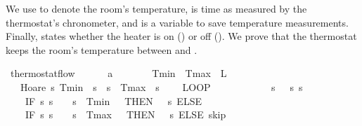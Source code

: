 \documentclass[envcountsame]{llncs}
\begin{document}
\begin{example}
We use  to denote the room's temperature, 
 is time as measured by the thermostat's chronometer, and  is a variable
to save temperature measurements. Finally,  states whether the heater is on 
() or off (). We prove that the thermostat keeps the room's 
temperature between  and .

\begin{isabellebody}
\isanewline
{}\isamarkupfalse%
\ thermostat{\isacharunderscore}flow{\isacharcolon}\ \isanewline
\ \ \ {\isachardoublequoteopen}{}\ {\isacharless}\ a{\isachardoublequoteclose}\ \ {\isachardoublequoteopen}{}\ {\isasymle}\ {\isasymtau}{\isachardoublequoteclose}\ \ {\isachardoublequoteopen}{}\ {\isacharless}\ Tmin{\isachardoublequoteclose}\ \ {\isachardoublequoteopen}Tmax\ {\isacharless}\ L{\isachardoublequoteclose}\isanewline
\ \ \ {\isachardoublequoteopen}Hoare\ {\isasymlceil}{\isasymlambda}s{\isachardot}\ Tmin\ {\isasymle}\ s{\isachardollar}{}\ {\isasymand}\ s{\isachardollar}{}\ {\isasymle}\ Tmax\ {\isasymand}\ s{\isachardollar}{}\ {\isacharequal}\ {}{\isasymrceil}\isanewline
\ \ {\isacharparenleft}LOOP\ \isanewline
\ \ \ \ %
\isanewline
\ \ \ \ {\isacharparenleft}{\isacharparenleft}{}\ {\isacharcolon}{\isacharcolon}{\isacharequal}\ {\isacharparenleft}{\isasymlambda}s{\isachardot}\ {}{\isacharparenright}{\isacharparenright}{\isacharsemicolon}{\isacharparenleft}{}\ {\isacharcolon}{\isacharcolon}{\isacharequal}\ {\isacharparenleft}{\isasymlambda}s{\isachardot}\ s{\isachardollar}{}{\isacharparenright}{\isacharparenright}{\isacharsemicolon}\isanewline
\ \ \ \ {\isacharparenleft}IF\ {\isacharparenleft}{\isasymlambda}s{\isachardot}\ s{\isachardollar}{}\ {\isacharequal}\ {}\ {\isasymand}\ s{\isachardollar}{}\ {\isasymle}\ Tmin\ {\isacharplus}\ {}{\isacharparenright}\ THEN\ {\isacharparenleft}{}\ {\isacharcolon}{\isacharcolon}{\isacharequal}\ {\isacharparenleft}{\isasymlambda}s{\isachardot}{}{\isacharparenright}{\isacharparenright}\ ELSE\ \isanewline
\ \ \ \ {\isacharparenleft}IF\ {\isacharparenleft}{\isasymlambda}s{\isachardot}\ s{\isachardollar}{}\ {\isacharequal}\ {}\ {\isasymand}\ s{\isachardollar}{}\ {\isasymge}\ Tmax\ {\isacharminus}\ {}{\isacharparenright}\ THEN\ {\isacharparenleft}{}\ {\isacharcolon}{\isacharcolon}{\isacharequal}\ {\isacharparenleft}{\isasymlambda}s{\isachardot}{}{\isacharparenright}{\isacharparenright}\ ELSE\ skip{\isacharparenright}{\isacharparenright}{\isacharsemicolon}\isanewline

\end{isabellebody}
\end{example}
\end{document}
